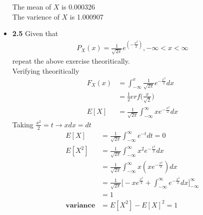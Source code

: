 \documentclass[journal,12pt,twocolumn]{IEEEtran}
\begin{document}
\begin{itemize}
    The mean of $X$ is 0.000326\\
    The varience of $X$ is 1.000907\\
    
    \item \textbf{2.5} Given that 
    \begin{align}
        P_X(x) = \frac{1}{\sqrt{2\pi}}e^{(-\frac{x^2}{2})}, -\infty < x < \infty
    \end{align}
    repeat the above exercise theoritically.\\
    \solution Verifying theoritically
    \begin{align}
        F_X(x) &= \int_{-\infty}^{x}\frac{1}{\sqrt{2\pi}}e^{-\frac{x^2}{2}}dx \\
        &= \frac{1}{2} erf\bigg(\frac{x}{\sqrt{2}}\bigg)\\
        E[X]&= \frac{1}{\sqrt{2\pi}} \int_{-\infty}^{\infty}xe^{-\frac{x^2}{2}}dx 
    \end{align}
    Taking $\frac{x^2}{2} = t \rightarrow xdx = dt$
    \begin{align}
        E[X]&= \frac{1}{\sqrt{2\pi}} \int_{-\infty}^{\infty}e^{-t} dt = 0 \\
        E[X^2]&= \frac{1}{\sqrt{2\pi}} \int_{-\infty}^{\infty}x^2e^{-\frac{x^2}{2}}dx \\
        &= \frac{1}{\sqrt{2\pi}} \int_{-\infty}^{\infty}x(xe^{-\frac{x^2}{2}})dx \\
        &= \frac{1}{\sqrt{2\pi}} \bigg[-xe^{\frac{x^2}{2}}+\int_{-\infty}^{\infty}e^{-\frac{x^2}{2}} dx \bigg]_{-\infty}^{\infty} \\
        &= 1 \\
        \textbf{variance} &= E[X^2] - E[X]^2 = 1
    \end{align}
\end{itemize}
\end{document}
